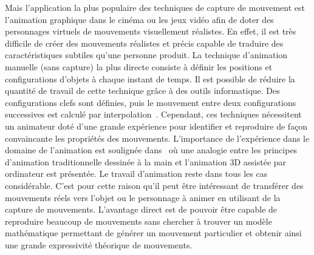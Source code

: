 Mais l'application la plus populaire des techniques de capture de mouvement
est l'animation graphique dans le cinéma ou les jeux vidéo afin de doter
des personnages virtuels de mouvements visuellement réalistes. En effet,
il est très difficile de créer des mouvements réalistes et précis
capable de traduire des caractéristiques subtiles qu'une personne produit.
La technique d'animation manuelle (sans capture) la plus directe consiste à définir les
positions et configurations d'objets à chaque instant de temps.
Il est possible de réduire la quantité de travail de cette technique gr\^ace à 
des outils informatique. Des configurations clefs sont définies, puis
le mouvement entre deux configurations successives est calculé par interpolation~\cite{burtnyk76, kovar03}.
Cependant, ces techniques nécessitent
un animateur doté d'une grande expérience pour identifier et reproduire
de façon convaincante les propriétés des mouvements.
L'importance de l'expérience dans le domaine de l'animation
est soulignée dans~\cite{lasseter87} où une analogie entre les principes d'animation 
traditionnelle dessinée à la main et l'animation 3D assistée par ordinateur est présentée.
Le travail d'animation reste dans tous les cas considérable.
C'est pour cette raison qu'il peut être intéressant de
transférer des mouvements réels vers l'objet ou le personnage à animer
en utilisant de la capture de mouvements. L'avantage direct est de pouvoir
être capable de reproduire beaucoup de mouvements sans chercher à 
trouver un modèle mathématique permettant de générer un mouvement particulier
et obtenir ainsi une grande expressivité théorique de mouvements.

